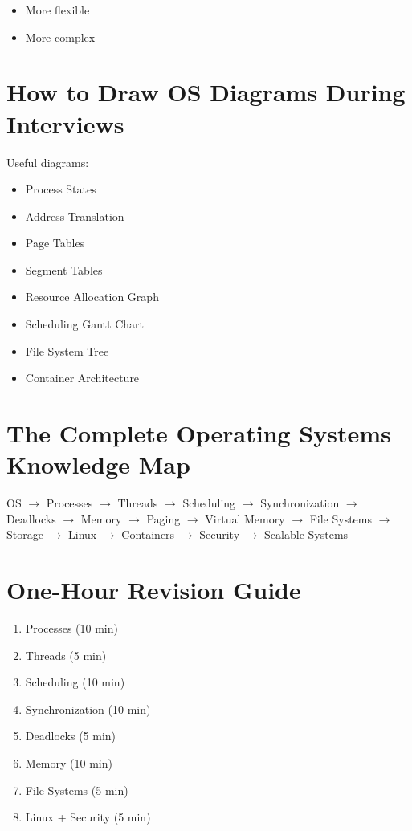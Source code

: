 \begin{itemize}
\item More flexible
\item More complex
\end{itemize}

\section{How to Draw OS Diagrams During Interviews}

Useful diagrams:

\begin{itemize}
\item Process States
\item Address Translation
\item Page Tables
\item Segment Tables
\item Resource Allocation Graph
\item Scheduling Gantt Chart
\item File System Tree
\item Container Architecture
\end{itemize}

\section{The Complete Operating Systems Knowledge Map}

\begin{center}
OS
$\rightarrow$
Processes
$\rightarrow$
Threads
$\rightarrow$
Scheduling
$\rightarrow$
Synchronization
$\rightarrow$
Deadlocks
$\rightarrow$
Memory
$\rightarrow$
Paging
$\rightarrow$
Virtual Memory
$\rightarrow$
File Systems
$\rightarrow$
Storage
$\rightarrow$
Linux
$\rightarrow$
Containers
$\rightarrow$
Security
$\rightarrow$
Scalable Systems
\end{center}

\section{One-Hour Revision Guide}

\begin{enumerate}
\item Processes (10 min)
\item Threads (5 min)
\item Scheduling (10 min)
\item Synchronization (10 min)
\item Deadlocks (5 min)
\item Memory (10 min)
\item File Systems (5 min)
\item Linux + Security (5 min)
\end{enumerate}

